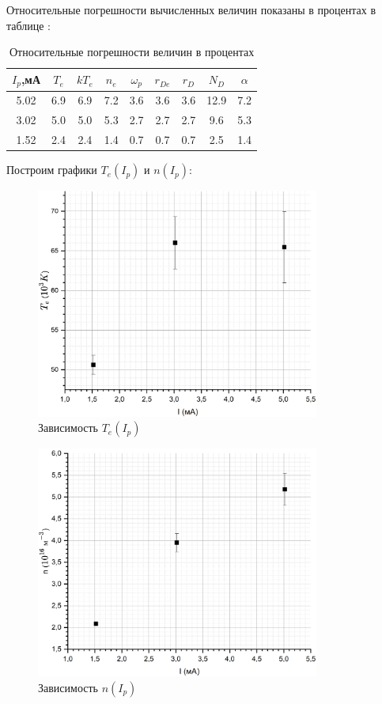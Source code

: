 \documentclass[a4paper, 12pt]{article}
\begin{document}
	Относительные погрешности вычисленных величин показаны в процентах в таблице : 
	\begin{table}[h!]
		\centering
		\begin{tabular}{|c|c|c|c|c|c|c|c|c|}
			\hline
			$I_p$,мА & $T_e$ & $kT_e$ & $n_e$ & $\omega_p$ & $r_{De}$ & $r_D$ & $N_D$ & $\alpha$ \\ \hline
			 5.02 & 6.9 & 6.9 & 7.2 & 3.6 & 3.6 & 3.6 & 12.9 & 7.2 \\ \hline
			 3.02 & 5.0 & 5.0 & 5.3 & 2.7 & 2.7 & 2.7 & 9.6 & 5.3 \\ \hline
			 1.52 & 2.4 & 2.4 & 1.4 & 0.7 & 0.7 & 0.7 &2.5 & 1.4 \\ \hline
		\end{tabular}
		\caption{Относительные погрешности величин в процентах}
	\end{table}
	
	Построим графики $T_e(I_p)$ и $n(I_p)$:
	
	\begin{figure}[h!]
		\centering
		\includegraphics[width = 0.83\textwidth]{T(I)}
		\caption{Зависимость $T_e(I_p)$}
	\end{figure}
	\begin{figure}[H]
		\centering
		\includegraphics[width = 0.83\textwidth]{n(I)}
		\caption{Зависимость $n(I_p)$}
	\end{figure}
	
\end{document}
